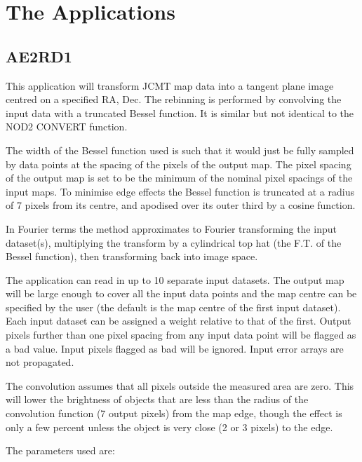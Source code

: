 \goodbreak

\section{The Applications}

\subsection{AE2RD1}

This application will transform JCMT map data into a tangent  plane
image centred on a specified RA, Dec. The rebinning is performed by
convolving the input data with a truncated Bessel function. It is
similar but not identical to the NOD2 CONVERT function. 

The width of the Bessel function used is such that it would just be
fully  sampled by data points at the spacing of the pixels of the
output  map. The pixel spacing of the output map is set to be the
minimum  of the nominal pixel spacings of the input maps. To minimise
edge  effects the Bessel function is truncated at a radius of 7 pixels 
from its centre, and apodised over its outer third by a cosine 
function.

In Fourier terms the method approximates to Fourier transforming the
input dataset(s), multiplying the transform by a cylindrical top hat
(the F.T. of the Bessel function), then transforming back into image
space. 

The application can read in up to 10 separate input datasets. The
output map will be large enough to cover all the input data  points
and the map centre can be specified by the user (the  default is the
map centre of the first input dataset). Each input  dataset can be
assigned a weight relative to that of the first.  Output pixels
further than one pixel spacing from any input data  point will be
flagged as a bad value. Input pixels flagged as bad will be ignored.
Input error arrays are not propagated.

The convolution assumes that all pixels outside the measured  area are
zero. This will lower the brightness of objects that are  less than
the radius of the convolution function (7 output pixels)  from the map
edge, though the effect is only a few percent unless  the object is
very close (2 or 3 pixels) to the edge. 

\goodbreak

The parameters used are:

